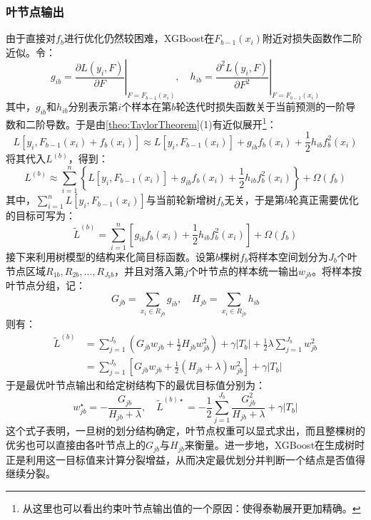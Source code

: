 \subsubsection{叶节点输出}
由于直接对$f_b$进行优化仍然较困难，XGBoost在$F_{b-1}(x_i)$附近对损失函数作二阶近似。令：
\begin{equation*}
	g_{ib}=\left.\frac{\partial L(y_i,F)}{\partial F}\right|_{F=F_{b-1}(x_i)},
	\quad
	h_{ib}=\left.\frac{\partial^2 L(y_i,F)}{\partial F^2}\right|_{F=F_{b-1}(x_i)}
\end{equation*}
其中，$g_{ib}$和$h_{ib}$分别表示第$i$个样本在第$b$轮迭代时损失函数关于当前预测的一阶导数和二阶导数。于是由\cref{theo:TaylorTheorem}(1)有近似展开\footnote{从这里也可以看出约束叶节点输出值的一个原因：使得泰勒展开更加精确。}：
\begin{equation*}
	L[y_i,F_{b-1}(x_i)+f_b(x_i)]\approx L[y_i,F_{b-1}(x_i)]+g_{ib}f_b(x_i)+\frac{1}{2}h_{ib}f_b^2(x_i)
\end{equation*}
将其代入$L^{(b)}$，得到：
\begin{equation*}
	L^{(b)}\approx\sum_{i=1}^{n}\left\{L[y_i,F_{b-1}(x_i)]+g_{ib}f_b(x_i)+\frac{1}{2}h_{ib}f_b^2(x_i)\right\}+\Omega(f_b)
\end{equation*}
其中，$\sum\limits_{i=1}^{n}L[y_i,F_{b-1}(x_i)]$与当前轮新增树$f_b$无关，于是第$b$轮真正需要优化的目标可写为：
\begin{equation*}
	\tilde{L}^{(b)}=\sum_{i=1}^{n}\left[g_{ib}f_b(x_i)+\frac{1}{2}h_{ib}f_b^2(x_i)\right]+\Omega(f_b)
\end{equation*}
接下来利用树模型的结构来化简目标函数。设第$b$棵树$f_b$将样本空间划分为$J_b$个叶节点区域$R_{1b},R_{2b},\dots,R_{J_bb}$，并且对落入第$j$个叶节点的样本统一输出$w_{jb}$。将样本按叶节点分组，记：
\begin{equation*}
	G_{jb}=\sum_{x_i\in R_{jb}}g_{ib},
	\quad
	H_{jb}=\sum_{x_i\in R_{jb}}h_{ib}
\end{equation*}
则有：
\begin{align*}
	\tilde{L}^{(b)}&=\sum_{j=1}^{J_b}\left(G_{jb}w_{jb}+\frac{1}{2}H_{jb}w_{jb}^2\right)+\gamma|T_b|+\frac{1}{2}\lambda\sum_{j=1}^{J_b}w_{jb}^2 \\
	&=\sum_{j=1}^{J_b}\left[G_{jb}w_{jb}+\frac{1}{2}(H_{jb}+\lambda)w_{jb}^2\right]+\gamma|T_b|
\end{align*}
于是最优叶节点输出和给定树结构下的最优目标值分别为：
\begin{equation*}
	w_{jb}^{\star}=-\frac{G_{jb}}{H_{jb}+\lambda},\quad\tilde{L}^{(b)\star}=-\frac{1}{2}\sum_{j=1}^{J_b}\frac{G_{jb}^2}{H_{jb}+\lambda}+\gamma|T_b|
\end{equation*}
这个式子表明，一旦树的划分结构确定，叶节点权重可以显式求出，而且整棵树的优劣也可以直接由各叶节点上的$G_{jb}$与$H_{jb}$来衡量。进一步地，XGBoost在生成树时正是利用这一目标值来计算分裂增益，从而决定最优划分并判断一个结点是否值得继续分裂。\par
